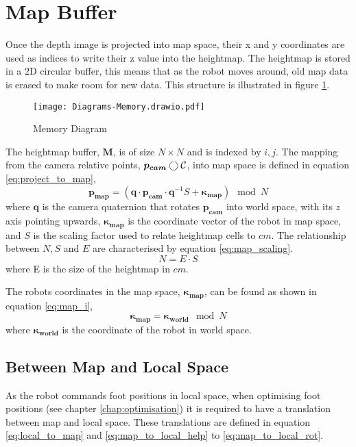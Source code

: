 \newpage
\section{Map Buffer}
    Once the depth image is projected into map space, their x and y coordinates are used as indices to write their z value into the heightmap. The heightmap is stored in
    a 2D circular buffer, this means that as the robot moves around, old map data is erased to make room for new data. This structure is illustrated in figure \ref{fig:memory}.
    \begin{figure}[h]
        \centering
        \texttt{[image: Diagrams-Memory.drawio.pdf]}
        \caption{Memory Diagram}
        \label{fig:memory}
    \end{figure}

    The heightmap buffer, \(\boldsymbol{M}\), is of size \(N \times N\) and is indexed by \(i,j\). The mapping from the camera relative points, \(\boldsymbol{p_{cam}} \bigcirc\mathcal{C}\), into map space
    is defined in equation \ref{eq:project_to_map},
    \begin{equation} \label{eq:project_to_map}
        \boldsymbol{p_{map}} = (\boldsymbol{q} \cdot \boldsymbol{p_{cam}} \cdot \boldsymbol{q}^{-1}S + \boldsymbol{\kappa_{map}}) \mod N
    \end{equation}
    where \(\boldsymbol{q}\) is the camera quaternion that rotates \(\boldsymbol{p_{cam}}\) into world space, with its \(z\) axis pointing upwards, \(\boldsymbol{\kappa_{map}}\) 
    is the coordinate vector of the robot in map space, and \(S\) is the scaling factor
    used to relate heightmap cells to \(cm\). The relationship between \(N, S\) and \(E\) are characterised by equation \ref{eq:map_scaling}.
    \begin{equation} \label{eq:map_scaling}
        N = E \cdot S
    \end{equation}
    where E is the size of the heightmap in \(cm\).

    The robots coordinates in the map space, \(\boldsymbol{\kappa_{map}}\), can be found as shown in equation \ref{eq:map_i},
    \begin{equation} \label{eq:map_i}
        \boldsymbol{\kappa_{map}} = \boldsymbol{\kappa_{world}} \mod N
    \end{equation}
    where \(\boldsymbol{\kappa_{world}}\) is the coordinate of the robot in world space.

    \subsection{Between Map and Local Space}
        As the robot commands foot positions in local space, when optimising foot positions (see chapter \ref{chap:optimisation}) it is required to have a translation between map and local space.
        These translations are defined in equation \ref{eq:local_to_map} and \ref{eq:map_to_local_help} to \ref{eq:map_to_local_rot}.
        
